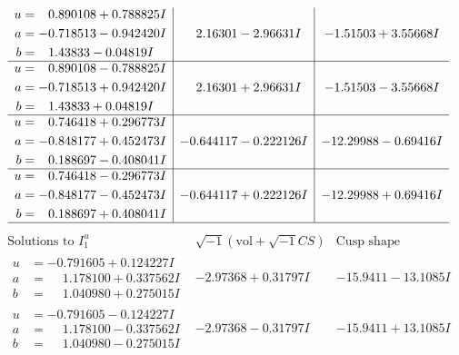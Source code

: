 \documentclass[1p]{elsarticle_modified}
\theoremstyle{definition}
\newcommand{\I}{\sqrt{-1}}
\begin{document}
$$\begin{array}{c|c|c}
\begin{aligned}
u &= \phantom{-}0.890108 + 0.788825 I \\
a &= -0.718513 - 0.942420 I \\
b &= \phantom{-}1.43833 - 0.04819 I\end{aligned}
 & \phantom{-}2.16301 - 2.96631 I & -1.51503 + 3.55668 I \\ \hline\begin{aligned}
u &= \phantom{-}0.890108 - 0.788825 I \\
a &= -0.718513 + 0.942420 I \\
b &= \phantom{-}1.43833 + 0.04819 I\end{aligned}
 & \phantom{-}2.16301 + 2.96631 I & -1.51503 - 3.55668 I \\ \hline\begin{aligned}
u &= \phantom{-}0.746418 + 0.296773 I \\
a &= -0.848177 + 0.452473 I \\
b &= \phantom{-}0.188697 - 0.408041 I\end{aligned}
 & -0.644117 - 0.222126 I & -12.29988 - 0.69416 I \\ \hline\begin{aligned}
u &= \phantom{-}0.746418 - 0.296773 I \\
a &= -0.848177 - 0.452473 I \\
b &= \phantom{-}0.188697 + 0.408041 I\end{aligned}
 & -0.644117 + 0.222126 I & -12.29988 + 0.69416 I\\
 \hline 
 \end{array}$$\newpage$$\begin{array}{c|c|c}  
\text{Solutions to }I^u_{1}& \I (\text{vol} + \sqrt{-1}CS) & \text{Cusp shape}\\
 \hline 
\begin{aligned}
u &= -0.791605 + 0.124227 I \\
a &= \phantom{-}1.178100 + 0.337562 I \\
b &= \phantom{-}1.040980 + 0.275015 I\end{aligned}
 & -2.97368 + 0.31797 I & -15.9411 - 13.1085 I \\ \hline\begin{aligned}
u &= -0.791605 - 0.124227 I \\
a &= \phantom{-}1.178100 - 0.337562 I \\
b &= \phantom{-}1.040980 - 0.275015 I\end{aligned}
 & -2.97368 - 0.31797 I & -15.9411 + 13.1085 I \\ \hline\begin{aligned}

\end{aligned}
\end{array}$$
\end{document}
